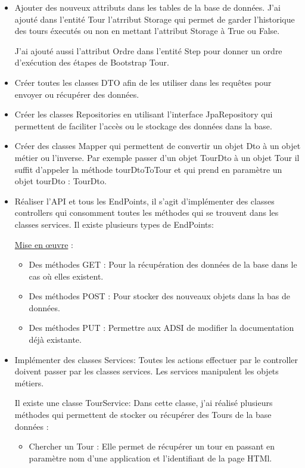 \documentclass[12pt]{article}
\begin{document}
\begin{itemize}

\item  Ajouter des nouveux attributs dans les tables de la base de données. J'ai ajouté dans l'entité Tour  l'atrribut Storage qui permet de garder l'historique des tours éxecutés ou non en mettant l’attribut Storage à True ou False.
  
J'ai ajouté aussi l'attribut Ordre dans l'entité Step pour donner un ordre  d’exécution des étapes de Bootstrap Tour. 

\item Créer toutes les classes DTO afin de les utiliser dans les requêtes  pour envoyer ou récupérer des données.

\item Créer les classes Repositories en utilisant l'interface JpaRepository qui permettent de faciliter l'accès ou le stockage des données dans la base.

\item Créer des classes Mapper qui permettent de convertir un objet Dto à un objet métier ou l'inverse. Par exemple passer d'un objet TourDto à un objet Tour il suffit d'appeler la méthode tourDtoToTour et qui prend en paramètre un objet tourDto : TourDto.  

\item Réaliser l'API et tous les EndPoints, il s'agit d’implémenter des classes controllers qui consomment toutes les méthodes qui se trouvent dans les classes services. Il existe plusieurs types de EndPoints: 

\underline{Mise en œuvre} : 
\begin{itemize}
\item Des méthodes GET : Pour la récupération des données de la base dans le cas où elles existent.

\item Des méthodes POST : Pour stocker des nouveaux objets dans la bas de données.

\item Des méthodes PUT : Permettre aux ADSI de modifier la documentation déjà existante. 

\end{itemize}
\item Implémenter des classes Services: Toutes les actions effectuer par le controller doivent passer par les classes services. Les services manipulent les objets métiers.

Il existe une classe TourService: Dans cette classe, j'ai réalisé plusieurs méthodes qui permettent de stocker ou récupérer des Tours de la base données : 
\begin{itemize}
\item Chercher un Tour : Elle permet de récupérer un tour en passant en paramètre nom d'une application et l'identifiant de la page HTMl. 


\end{itemize}
\end{itemize}
\end{document}
